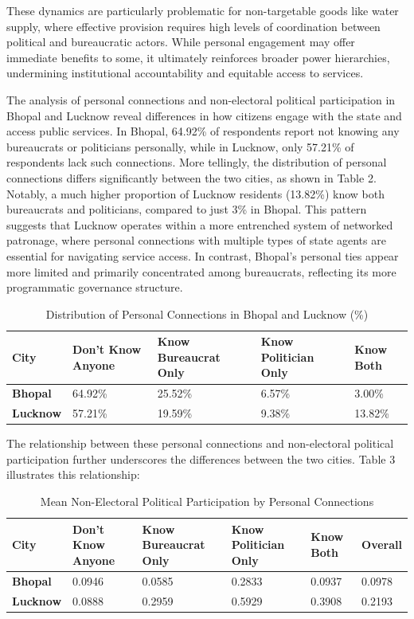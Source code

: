 These dynamics are particularly problematic for non-targetable goods like water supply, where effective provision requires high levels of coordination between political and bureaucratic actors. While personal engagement may offer immediate benefits to some, it ultimately reinforces broader power hierarchies, undermining institutional accountability and equitable access to services.

The analysis of personal connections and non-electoral political participation in Bhopal and Lucknow reveal differences in how citizens engage with the state and access public services. In Bhopal, 64.92\% of respondents report not knowing any bureaucrats or politicians personally, while in Lucknow, only 57.21\% of respondents lack such connections. More tellingly, the distribution of personal connections differs significantly between the two cities, as shown in Table 2. Notably, a much higher proportion of Lucknow residents (13.82\%) know both bureaucrats and politicians, compared to just 3\% in Bhopal. This pattern suggests that Lucknow operates within a more entrenched system of networked patronage, where personal connections with multiple types of state agents are essential for navigating service access. In contrast, Bhopal's personal ties appear more limited and primarily concentrated among bureaucrats, reflecting its more programmatic governance structure.
\begin{table}[ht]
\centering
\caption{Distribution of Personal Connections in Bhopal and Lucknow (\%)}
\begin{tabular}{|p{2cm}|p{3cm}|p{3cm}|p{3cm}|p{2.3cm}|}
\hline
\textbf{City} & \textbf{Don't Know Anyone} & \textbf{Know Bureaucrat Only} & \textbf{Know Politician Only} & \textbf{Know Both} \\ \hline
\textbf{Bhopal}   & 64.92\% & 25.52\% & 6.57\% & 3.00\%  \\ \hline
\textbf{Lucknow}  & 57.21\% & 19.59\% & 9.38\% & 13.82\% \\ \hline
\end{tabular}
\end{table}

The relationship between these personal connections and non-electoral political participation further underscores the differences between the two cities. Table 3 illustrates this relationship:

\begin{table}[ht]
\centering
\caption{Mean Non-Electoral Political Participation by Personal Connections}
\begin{tabular}{|p{2cm}|p{2cm}|p{2cm}|p{2cm}|p{2cm}|p{2cm}|}
\hline
\textbf{City} & \textbf{Don't Know Anyone} & \textbf{Know Bureaucrat Only} & \textbf{Know Politician Only} & \textbf{Know Both} & \textbf{Overall} \\ \hline
\textbf{Bhopal}   & 0.0946  & 0.0585  & 0.2833  & 0.0937  & 0.0978  \\ \hline
\textbf{Lucknow}  & 0.0888  & 0.2959  & 0.5929  & 0.3908  & 0.2193  \\ \hline
\end{tabular}
\end{table}

